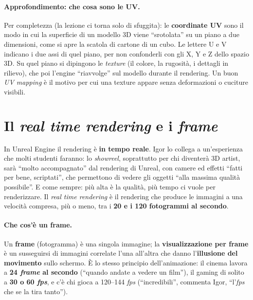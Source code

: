 \paragraph{Approfondimento: che cosa sono le UV.} Per completezza (la lezione ci torna
solo di sfuggita): le \textbf{coordinate UV} sono il modo in cui la superficie di un
modello 3D viene ``srotolata'' su un piano a due dimensioni, come si apre la scatola di
cartone di un cubo. Le lettere U e V indicano i due assi di quel piano, per non
confonderli con gli X, Y e Z dello spazio 3D. Su quel piano si dipingono le
\emph{texture} (il colore, la rugosità, i dettagli in rilievo), che poi l'engine
``riavvolge'' sul modello durante il rendering. Un buon \emph{UV mapping} è il motivo
per cui una texture appare senza deformazioni o cuciture visibili.

\section{Il \emph{real time rendering} e i \emph{frame}}
\label{ue1:sec:realtime}

In Unreal Engine il rendering è \textbf{in tempo reale}. Igor lo collega a un'esperienza
che molti studenti faranno: lo \emph{showreel}, soprattutto per chi diventerà 3D artist,
sarà ``molto accompagnato'' dal rendering di Unreal, con camere ed effetti ``fatti per
bene, scriptati'', che permettono di vedere gli oggetti ``alla massima qualità
possibile''. E come sempre: più alta è la qualità, più tempo ci vuole per renderizzare.
Il \emph{real time rendering} è il rendering che produce le immagini a una velocità
compresa, più o meno, tra i \textbf{20 e i 120 fotogrammi al secondo}.

\paragraph{Che cos'è un frame.} Un \textbf{frame} (fotogramma) è una singola immagine; la
\textbf{visualizzazione per frame} è un susseguirsi di immagini correlate l'una
all'altra che danno l'\textbf{illusione del movimento} sullo schermo. È lo stesso
principio dell'animazione: il cinema lavora a \textbf{24 \emph{frame} al secondo}
(``quando andate a vedere un film''), il gaming di solito a \textbf{30 o 60
\emph{fps}}, e c'è chi gioca a 120--144 \emph{fps} (``incredibili'', commenta Igor,
``l'\emph{fps} che se la tira tanto'').

